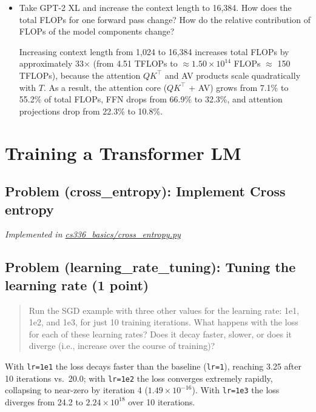 \documentclass[letterpaper]{article}
\begin{document}
\begin{itemize}
	\item[(e)] Take GPT-2 XL and increase the context length to 16,384. How does the total FLOPs for one forward pass change? How do the relative contribution of FLOPs of the model components change?

	Increasing context length from 1,024 to 16,384 increases total FLOPs by approximately 33$\times$ (from 4.51 TFLOPs to $\approx1.50\times10^{14}$ FLOPs $\approx$ 150 TFLOPs), because the attention $QK^\top$ and AV products scale quadratically with $T$. As a result, the attention core ($QK^\top$ + AV) grows from 7.1\% to 55.2\% of total FLOPs, FFN drops from 66.9\% to 32.3\%, and attention projections drop from 22.3\% to 10.8\%.

\end{itemize}

\section{Training a Transformer LM}

\subsection{Problem (cross\_entropy): Implement Cross entropy}

\textit{Implemented in  \href{https://github.com/echung32/ece405-assignment1-basics/blob/main/cs336_basics/cross_entropy.py}{cs336\_basics/cross\_entropy.py}}

\subsection{Problem (learning\_rate\_tuning): Tuning the learning rate (1 point)}

\begin{quote}
	Run the SGD example with three other values for the learning rate: 1e1, 1e2, and 1e3, for just 10 training iterations. What happens with the loss for each of these learning rates? Does it decay faster, slower, or does it diverge (i.e., increase over the course of training)?
\end{quote}

With \texttt{lr=1e1} the loss decays faster than the baseline (\texttt{lr=1}), reaching 3.25 after 10 iterations vs.\ 20.0; with \texttt{lr=1e2} the loss converges extremely rapidly, collapsing to near-zero by iteration 4 ($1.49 \times 10^{-16}$). With \texttt{lr=1e3} the loss diverges from 24.2 to $2.24 \times 10^{18}$ over 10 iterations.
\end{document}
